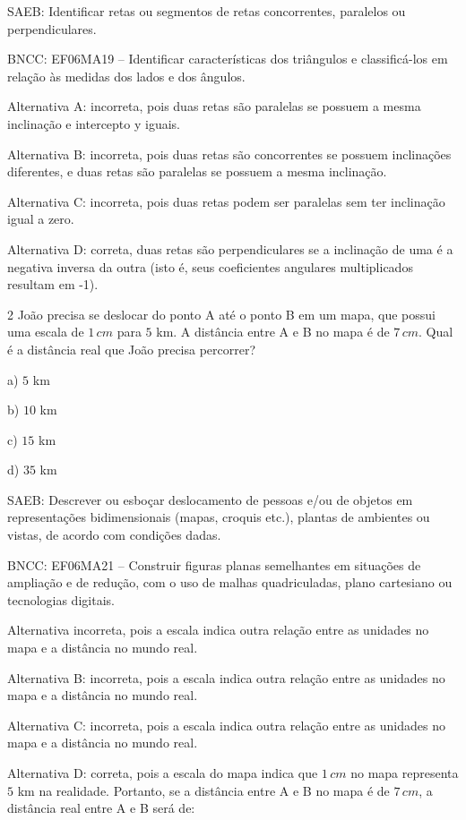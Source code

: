 SAEB: Identificar retas ou segmentos de retas concorrentes, paralelos ou
perpendiculares.

BNCC: EF06MA19 -- Identificar características dos triângulos e
classificá-los em relação às medidas dos lados e dos ângulos.

Alternativa A: incorreta, pois duas retas são paralelas se possuem a
mesma inclinação e intercepto y iguais.

Alternativa B: incorreta, pois duas retas são concorrentes se possuem
inclinações diferentes, e duas retas são paralelas se possuem a mesma
inclinação.

Alternativa C: incorreta, pois duas retas podem ser paralelas sem ter
inclinação igual a zero.

Alternativa D: correta, duas retas são perpendiculares se a inclinação
de uma é a negativa inversa da outra (isto é, seus coeficientes
angulares multiplicados resultam em -1).

\num{2}  João precisa se deslocar do ponto A até o ponto B em um mapa, que
possui uma escala de $1\,cm$ para $5$ km. A distância entre A e B no mapa é
de $7\,cm$. Qual é a distância real que João precisa percorrer?

a) $5$ km

b) $10$ km

c) $15$ km

d) $35$ km

SAEB: Descrever ou esboçar deslocamento de pessoas e/ou de objetos em
representações bidimensionais (mapas, croquis etc.), plantas de
ambientes ou vistas, de acordo com condições dadas.

BNCC: EF06MA21 -- Construir figuras planas semelhantes em situações de
ampliação e de redução, com o uso de malhas quadriculadas, plano
cartesiano ou tecnologias digitais.

Alternativa incorreta, pois a escala indica outra relação entre as
unidades no mapa e a distância no mundo real.

Alternativa B: incorreta, pois a escala indica outra relação entre as
unidades no mapa e a distância no mundo real.

Alternativa C: incorreta, pois a escala indica outra relação entre as
unidades no mapa e a distância no mundo real.

Alternativa D: correta, pois a escala do mapa indica que $1\,cm$ no mapa
representa $5$ km na realidade. Portanto, se a distância entre A e B no
mapa é de $7\,cm$, a distância real entre A e B será de:

